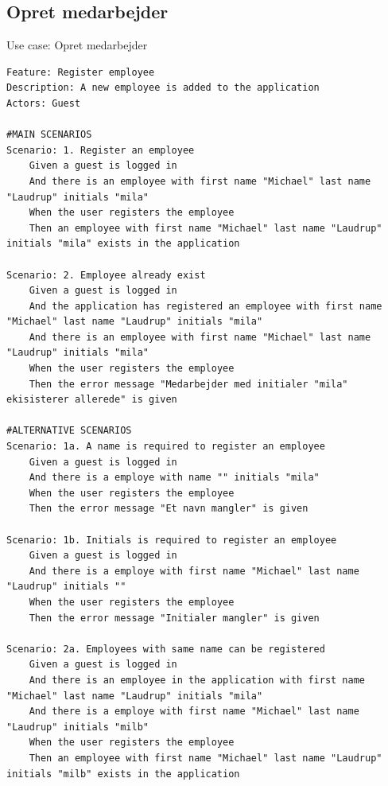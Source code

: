 \subsection{Opret medarbejder}
\begin{listing}[H]
    \centering
    \caption{Use case: Opret medarbejder}\label{lst:usecase_register_employee}
    \begin{verbatim}  
Feature: Register employee
Description: A new employee is added to the application
Actors: Guest

#MAIN SCENARIOS
Scenario: 1. Register an employee
    Given a guest is logged in
    And there is an employee with first name "Michael" last name "Laudrup" initials "mila"  
    When the user registers the employee
    Then an employee with first name "Michael" last name "Laudrup" initials "mila" exists in the application

Scenario: 2. Employee already exist
    Given a guest is logged in
    And the application has registered an employee with first name "Michael" last name "Laudrup" initials "mila"
    And there is an employee with first name "Michael" last name "Laudrup" initials "mila"
    When the user registers the employee
    Then the error message "Medarbejder med initialer "mila" ekisisterer allerede" is given

#ALTERNATIVE SCENARIOS
Scenario: 1a. A name is required to register an employee
    Given a guest is logged in
    And there is a employe with name "" initials "mila"  
    When the user registers the employee
    Then the error message "Et navn mangler" is given

Scenario: 1b. Initials is required to register an employee
    Given a guest is logged in
    And there is a employe with first name "Michael" last name "Laudrup" initials ""
    When the user registers the employee
    Then the error message "Initialer mangler" is given

Scenario: 2a. Employees with same name can be registered
    Given a guest is logged in
    And there is an employee in the application with first name "Michael" last name "Laudrup" initials "mila"
    And there is a employe with first name "Michael" last name "Laudrup" initials "milb"  
    When the user registers the employee
    Then an employee with first name "Michael" last name "Laudrup" initials "milb" exists in the application

    \end{verbatim}
\end{listing}

